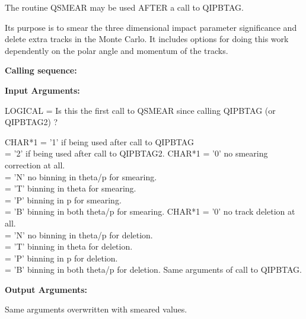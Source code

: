      The routine QSMEAR may be used AFTER a call to     QIPBTAG.

Its purpose is to
 smear the three dimensional impact parameter
significance and delete extra tracks in the Monte Carlo. It includes
options for doing this work dependently on the polar angle and
momentum of the tracks.

{\bf Calling sequence:}

 
\par
{}
\par

{\bf Input Arguments:}
 
\begin{indentlist}{ 3.50cm}{ 3.75cm}

     LOGICAL  = Is this the first call to QSMEAR since
                          calling QIPBTAG (or QIPBTAG2) ?

         CHAR*1   = '1' if being used after call to QIPBTAG\\
                        = '2' if being used after call to QIPBTAG2.
         CHAR*1    = '0' no smearing correction at all.\\
                        = 'N' no binning in theta/p for smearing.\\
                        = 'T' binning in theta for smearing.\\
                        = 'P' binning in p for smearing.\\
                        = 'B' binning in both theta/p for smearing.
         CHAR*1    = '0' no track deletion at all.\\
                        = 'N' no binning in theta/p for deletion.\\
                        = 'T' binning in theta for deletion.\\
                        = 'P' binning in p for deletion.\\
                        = 'B' binning in both theta/p for deletion.
         Same arguments of call to QIPBTAG.

\end{indentlist}

\par
{\bf Output Arguments:}  
 
    Same arguments overwritten with smeared values.

